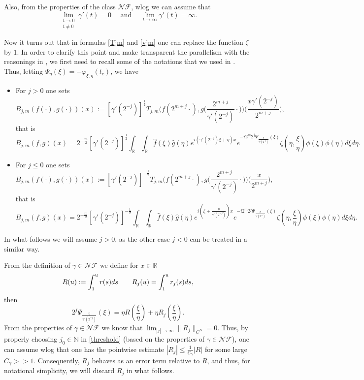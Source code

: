 \documentclass{amsart}
\newcommand{\R}{\mathbb{R}}
\newcommand{\N}{\mathbb{N}}
\newcommand{\g}{\gamma}
\newcommand{\NF}{\mathcal{NF}}
\theoremstyle{definition}
\theoremstyle{remark}
\numberwithin{equation}{section}
\begin{document}
Also, from the properties of the class $\NF$, wlog we can assume that
\begin{equation}\label{lim}
 \lim\limits_{\substack{t\to0\\ t\not=0}}\gamma'(t)=0\quad \text{ and } \quad \lim\limits_{t\to\infty}\gamma'(t)=\infty.
\end{equation}

Now it turns out that in formulas \eqref{Tjm} and \eqref{vjm} one can replace the function $\zeta$ by $1$. In order to clarify this point and make transparent the parallelism with the reasonings in \cite{lie2015boundedness}, we first need to recall some of the notations that we used in \cite{lie2015boundedness}. Thus, letting $\Psi_\eta(\xi)=-\varphi_{\xi,\eta}(t_c)$, we have




\begin{itemize}
 \item For $j>0$ one sets
\begin{equation}\label{BTtr1}
B_{j,m}(f(\cdot),g(\cdot))(x):=[\gamma'(2^{-j})]^\frac{1}{2}T_{j,m} \Big(f(2^{m+j}\cdot),g\Big(\frac{2^{m+j}}{\gamma'(2^{-j})} \cdot\Big)\Big)\Big(\frac{x\gamma'(2^{-j})}{2^{m+j}}\Big),
\end{equation}
that is
\[
B_{j,m}(f,g)(x)=2^{-\frac{m}{2}}[\gamma'(2^{-j})]^\frac{1}{2} \int_\R \int_\R \hat{f}(\xi)\hat{g}(\eta)e^{i(\gamma'(2^{-j})\xi+\eta)x}e^{-i 2^m 2^{j}\Psi_{\frac{\eta}{\gamma'(2^{-j})}}(\xi)}\zeta(\eta,\frac{\xi}{\eta})\phi(\xi)\phi(\eta)d\xi d\eta.
\]
 \item For $j\le 0$ one sets
\begin{equation}\label{BTtr2}
B_{j,m}(f(\cdot),g(\cdot))(x):=[\gamma'(2^{-j})]^{-\frac{1}{2}}T_{j,m} \Big(f(2^{m+j}\cdot),g\Big(\frac{2^{m+j}}{\gamma'(2^{-j})} \cdot\Big)\Big)\Big(\frac{x}{2^{m+j}}\Big),
\end{equation}
that is
\[
B_{j,m}(f,g)(x)=2^{-\frac{m}{2}}[\gamma'(2^{-j})]^{-\frac{1}{2}} \int_\R \int_\R
\hat{f}(\xi)\hat{g}(\eta)e^{i(\xi+\frac{\eta}{\gamma'(2^{-j})})x} e^{-i 2^m 2^{j}\Psi_{\frac{\eta}{\gamma'(2^{-j})}}(\xi)}
\zeta(\eta,\frac{\xi}{\eta})\phi(\xi)\phi(\eta)d\xi d\eta.
\]
\end{itemize}
In what follows we will assume $j>0$, as the other case $j < 0$ can be treated in a similar way.

From the definition of $\gamma\in\NF$ we define for $x\in\R$
\[
 R(u):=\int_1^u r(s)ds \quad\text\quad R_{j}(u)=\int_1^u r_{j}(s)ds,
\]
then
\[
 2^{j}\Psi_{\frac{\eta}{\gamma'(2^{-j})}}(\xi)=\eta R(\frac{\xi}{\eta})+\eta R_{j}(\frac{\xi}{\eta}).
\]
From the properties of $\g\in\NF$ we know that $\lim_{|j|\rightarrow\infty} \|R_j\|_{C^N}=0$. Thus, by properly choosing $j_0\in\N$ in \eqref{threshold} (based on the properties of $\g\in\NF$), one can assume wlog that one has the pointwise estimate $|R_j|\leq \frac{1}{C_{\g}}|R|$ for some large $C_{\g}>>1$. Consequently, $R_j$ behaves as an error term relative to $R$, and thus, for notational simplicity,  we will discard $R_j$ in what follows.
\end{document}
